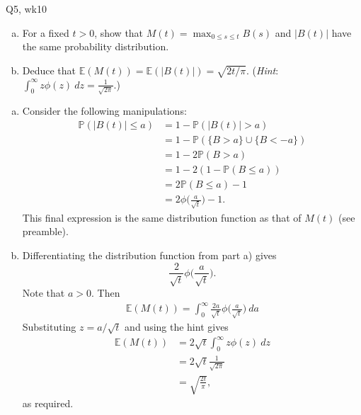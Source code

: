 \begin{problem}{Q5, wk10}{}


    \begin{enumerate}[a)]
        \item For a fixed $t > 0$, show that $M(t) = \max_{0 \leq s \leq t} B(s)$ and $\lvert B(t) \rvert$ have the same probability distribution.
        \item Deduce that $\mathbb{E}(M(t)) = \mathbb{E}(\lvert B(t) \rvert) = \sqrt{2 t / \pi}$. (\textit{Hint}: $\int_0^\infty z \phi(z) \ dz = \frac{1}{\sqrt{2 \pi}}$.)
    \end{enumerate}

    \tcblower

    \begin{enumerate}[a)]
        \item Consider the following manipulations:
                \begin{align*}
                    \mathbb{P}(\lvert B(t) \rvert \leq a) &= 1 - \mathbb{P}(\vert B(t) \rvert > a) \\
                    &= 1 - \mathbb{P}(\{B > a\} \cup \{B < -a\}) \\
                    &= 1 - 2\mathbb{P}(B > a) \\
                    &= 1 - 2(1 - \mathbb{P}(B \leq a)) \\
                    &= 2 \mathbb{P}(B \leq a) - 1 \\
                    &= 2 \phi \biggl( \frac{a}{\sqrt{t}} \biggr) - 1 .
                \end{align*}
            This final expression is the same distribution function as that of $M(t)$ (see preamble).
        \item Differentiating the distribution function from part a) gives
            $$ \frac{2}{\sqrt{t}} \phi \biggl( \frac{a}{\sqrt{t}} \biggr) . $$
            Note that $a > 0$. Then
                \begin{align*}
                    \mathbb{E}(M(t)) = \int_0^\infty \frac{2 a}{\sqrt{t}} \phi \biggl( \frac{a}{\sqrt{t}} \biggr) \ da
                \end{align*}
            Substituting $z = a / \sqrt{t}$ and using the hint gives
                \begin{align*}
                    \mathbb{E}(M(t)) &= 2 \sqrt{t} \int_0^\infty z \phi (z) \ dz \\
                    &= 2 \sqrt{t} \frac{1}{\sqrt{2 \pi}} \\
                    &= \sqrt{\frac{2t}{\pi}} ,
                \end{align*}
            as required.
    \end{enumerate}
        
\end{problem}


